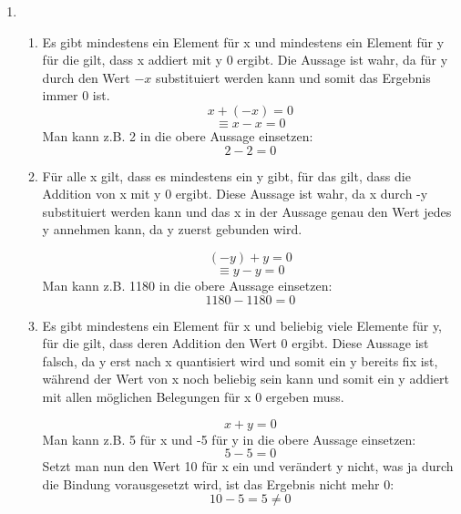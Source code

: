 \documentclass[a4paper]{article}
\begin{document}
	\begin{enumerate}
		\item
		\begin{enumerate}
			\item
			Es gibt mindestens ein Element für x und mindestens ein Element für y für die gilt, dass x addiert mit y 0 ergibt.
			\newline
			Die Aussage ist wahr, da für y durch den Wert $-x$ substituiert werden kann und somit das Ergebnis immer 0 ist.
			\begin{equation*}
				x + (-x) = 0
			\end{equation*}
			\begin{equation*}
				\equiv x - x = 0
			\end{equation*}
			Man kann z.B. 2 in die obere Aussage einsetzen:
			\begin{equation*}
				2 - 2 = 0
			\end{equation*}
			
			\item
			Für alle x gilt, dass es mindestens ein y gibt, für das gilt, dass die Addition von x mit y 0 ergibt.
			\newline
			Diese Aussage ist wahr, da x durch -y substituiert werden kann und das x in der Aussage genau den Wert jedes y annehmen kann, da y zuerst gebunden wird.
			
			\begin{equation*}
				(-y) + y = 0
			\end{equation*}
			\begin{equation*}
				\equiv y - y = 0
			\end{equation*}
			Man kann z.B. 1180 in die obere Aussage einsetzen:
			\begin{equation*}
				1180 - 1180 = 0
			\end{equation*}
			
			\item
			Es gibt mindestens ein Element für x und beliebig viele Elemente für y, für die gilt, dass deren Addition den Wert 0 ergibt.
			\newline
			Diese Aussage ist falsch, da y erst nach x quantisiert wird und somit ein y bereits fix ist, während der Wert von x noch beliebig sein kann und somit ein y addiert mit allen möglichen Belegungen für x 0 ergeben muss.
			
			\begin{equation*}
				x + y = 0
			\end{equation*}
			Man kann z.B. 5 für x und -5 für y in die obere Aussage einsetzen:
			\begin{equation*}
				5 - 5 = 0
			\end{equation*}
			Setzt man nun den Wert 10 für x ein und verändert y nicht, was ja durch die Bindung vorausgesetzt wird, ist das Ergebnis nicht mehr 0:
			\begin{equation*}
				10 - 5 = 5 \neq 0
			\end{equation*}
			

\end{enumerate}
\end{enumerate}
\end{document}
